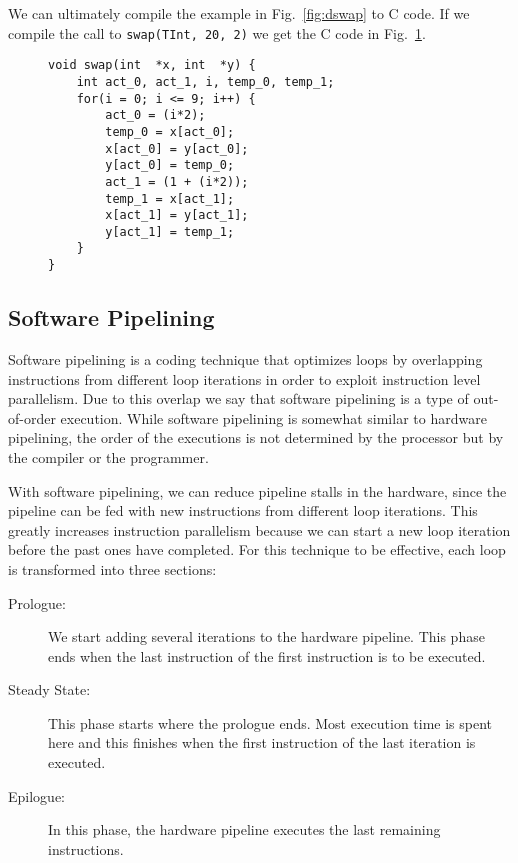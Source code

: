 \documentclass[10pt]{article}
\begin{document}
We can ultimately compile the example in Fig.~\ref{fig:dswap} to C code. If we compile the call to \texttt{swap(TInt, 20, 2)}
we get the C code in Fig.~\ref{fig:dswap_compiled}.

\lstset{basicstyle=\small,language=C}

\begin{figure}[ht]
\begin{lstlisting}
void swap(int  *x, int  *y) {
    int act_0, act_1, i, temp_0, temp_1;
    for(i = 0; i <= 9; i++) {
        act_0 = (i*2);
        temp_0 = x[act_0];
        x[act_0] = y[act_0];
        y[act_0] = temp_0;
        act_1 = (1 + (i*2));
        temp_1 = x[act_1];
        x[act_1] = y[act_1];
        y[act_1] = temp_1;
    }
}
\end{lstlisting}
\label{fig:dswap_compiled}
\end{figure}

\subsection{Software Pipelining}

Software pipelining is a coding technique that optimizes loops by overlapping instructions
from different loop iterations in order to exploit instruction level parallelism.
Due to this overlap we say that software pipelining is a type of out-of-order execution.
While software pipelining is somewhat similar to hardware pipelining, the order of the executions
is not determined by the processor but by the compiler or the programmer.

With software pipelining, we can reduce
pipeline stalls in the hardware, since the pipeline can be fed with new instructions from
different loop iterations. This greatly increases instruction parallelism because we can
start a new loop iteration before the past ones have completed. For this technique to be
effective, each loop is transformed into three sections:

\begin{description}
   \item[Prologue:] We start adding several iterations to the hardware pipeline.
   This phase ends when the last instruction of the first instruction is to be executed.

   \item[Steady State:] This phase starts where the prologue ends. Most execution time is spent
   here and this finishes when the first instruction of the last iteration is executed.

   \item[Epilogue:] In this phase, the hardware pipeline executes the last remaining instructions.
\end{description}
\end{document}
